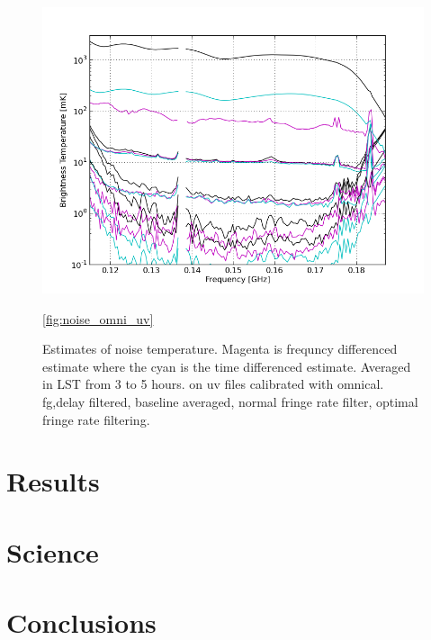 \documentclass[twocolumn,numberedappendix]{emulateapj}
\begin{document}
\begin{figure}[h!]\centering
\includegraphics[width=\columnwidth, height=.8\columnwidth]{plots/noise_vs_fq_plot.png}
\caption{Estimates of noise temperature. Magenta is frequncy differenced
estimate where the cyan is the time differenced estimate. Averaged in LST from 3
to 5 hours. on uv files calibrated with omnical. fg,delay filtered, baseline
averaged, normal fringe rate filter, optimal fringe rate filtering.}
\ref{fig:noise_omni_uv}
\end{figure}



% 


\section{Results}

\section{Science}

\section{Conclusions}


%
%
\end{document}

